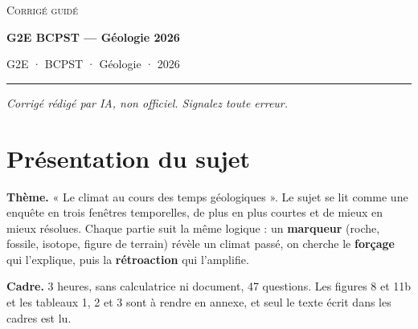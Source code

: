 \documentclass[11pt,a4paper]{article}
\begin{document}
\thispagestyle{plain}
\begin{center}
  {\small\scshape Corrigé guidé}\par\smallskip
  {\LARGE\bfseries G2E BCPST — Géologie 2026\par}\medskip
  {\large G2E · BCPST · Géologie · 2026\par}
\end{center}
\vspace{2pt}\hrule\vspace{8pt}

\emph{Corrigé rédigé par IA, non officiel. Signalez toute erreur.}

\hypertarget{pruxe9sentation-du-sujet}{%
\section{Présentation du sujet}\label{pruxe9sentation-du-sujet}}

\textbf{Thème.} « Le climat au cours des temps géologiques ». Le sujet se lit comme une enquête en trois fenêtres temporelles, de plus en plus courtes et de mieux en mieux résolues. Chaque partie suit la même logique : un \textbf{marqueur} (roche, fossile, isotope, figure de terrain) révèle un climat passé, on cherche le \textbf{forçage} qui l'explique, puis la \textbf{rétroaction} qui l'amplifie.

\textbf{Cadre.} 3 heures, sans calculatrice ni document, 47 questions. Les figures 8 et 11b et les tableaux 1, 2 et 3 sont à rendre en annexe, et seul le texte écrit dans les cadres est lu.
\end{document}
